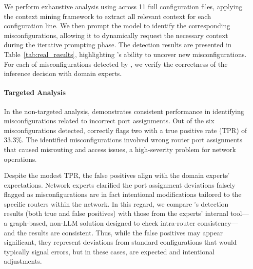 We perform exhaustive analysis using \sysname{} across 11 full configuration files, applying the context mining framework to extract all relevant context for each configuration line. We then prompt the model to identify the corresponding misconfigurations, allowing it to dynamically request the necessary context during the iterative prompting phase. The detection results are presented in Table~\ref{tab:real_results}, highlighting \sysname{}'s ability to uncover new misconfigurations. For each of misconfigurations detected by \sysname{}, we verify the correctness of the inference decision with domain experts. 

\paragraph{Targeted Analysis} 
In the non-targeted analysis, \sysname{} demonstrates consistent performance
in identifying misconfigurations related to incorrect port assignments. Out of the six misconfigurations detected, \sysname{} correctly flags two with a true positive rate (TPR) of 33.3\%. The identified misconfigurations involved wrong router port assignments that caused misrouting and access issues, a high-severity problem for network operations.

Despite the modest TPR, the false positives align with the domain experts' expectations. Network experts clarified the port assignment deviations falsely flagged as misconfigurations are in fact intentional modifications tailored to the specific routers within the network. In this regard, we compare \sysname{}'s detection results (both true and false positives) with those from the experts' internal tool—a graph-based, non-LLM solution designed to check intra-router consistency— and the results are consistent.
Thus, while the false positives may appear significant, they represent deviations from standard configurations that would typically signal errors, but in these cases, are expected and intentional adjustments.


